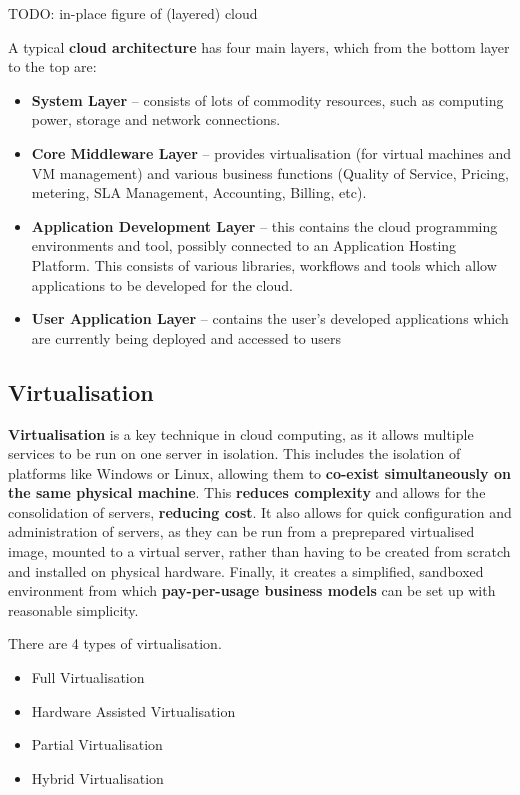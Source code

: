 \documentclass{article}
\begin{document}
TODO: in-place figure of (layered) cloud

A typical \textbf{cloud architecture} has four main layers, which from the bottom layer to the top are:
\begin{itemize}
	\item \textbf{System Layer} -- consists of lots of commodity resources, such as computing power, storage and network connections.
	\item \textbf{Core Middleware Layer} -- provides virtualisation (for virtual machines and VM management) and various business functions (Quality of Service, Pricing, metering, SLA Management, Accounting, Billing, etc).
	\item \textbf{Application Development Layer} -- this contains the cloud programming environments and tool, possibly connected to an Application Hosting Platform. This consists of various libraries, workflows and tools which allow applications to be developed for the cloud. 
	\item \textbf{User Application Layer} -- contains the user's developed applications which are currently being deployed and accessed to users
\end{itemize}

\subsection{Virtualisation}

\textbf{Virtualisation} is a key technique in cloud computing, as it allows multiple services to be run on one server in isolation. This includes the isolation of platforms like Windows or Linux, allowing them to \textbf{co-exist simultaneously on the same physical machine}. This \textbf{reduces complexity} and allows for the consolidation of servers, \textbf{reducing cost}. It also allows for quick configuration and administration of servers, as they can be run from a preprepared virtualised image, mounted to a virtual server, rather than having to be created from scratch and installed on physical hardware. Finally, it creates a simplified, sandboxed environment from which \textbf{pay-per-usage business models} can be set up with reasonable simplicity. 

There are 4 types of virtualisation.
\begin{itemize}
    \item Full Virtualisation
    \item Hardware Assisted Virtualisation
    \item Partial Virtualisation
    \item Hybrid Virtualisation
\end{itemize}
\end{document}
